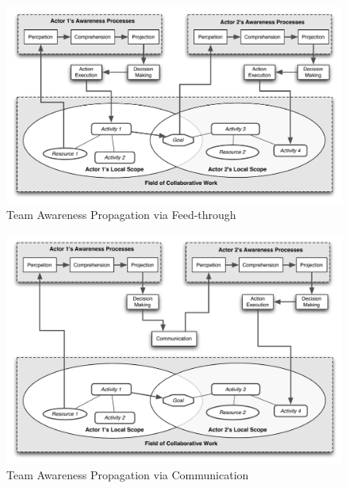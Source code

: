 
\begin{figure}[htbp] %
   \centering
   \includegraphics[width=5in]{team_processes_feedthrough.pdf} 
   \caption{Team Awareness Propagation via Feed-through}
   \label{fig:team_processes_feedthrough}
\end{figure}

\begin{figure}[htbp] %
   \centering
   \includegraphics[width=5in]{team_processes_communication.pdf} 
   \caption{Team Awareness Propagation via Communication}
   \label{fig:team_processes_communication}
\end{figure}

